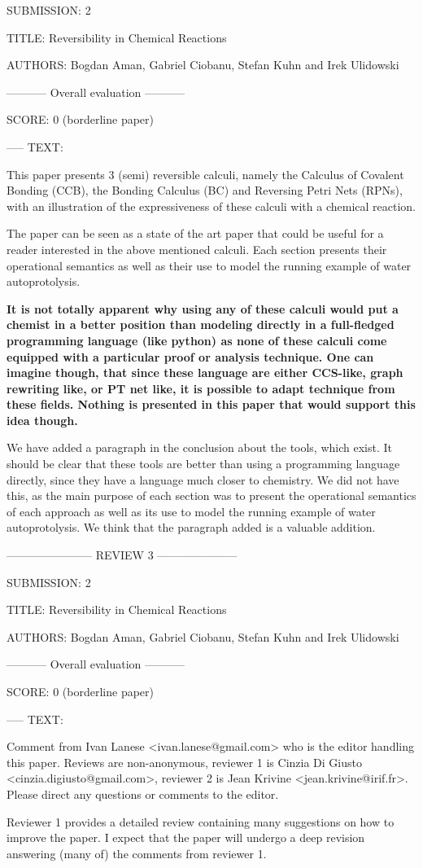 \documentclass{article}
\begin{document}
SUBMISSION: 2

TITLE: Reversibility in Chemical Reactions

AUTHORS: Bogdan Aman, Gabriel Ciobanu, Stefan Kuhn and Irek Ulidowski

----------- Overall evaluation -----------

SCORE: 0 (borderline paper)

----- TEXT:

This paper presents 3 (semi) reversible calculi, namely the Calculus of Covalent Bonding (CCB), the Bonding Calculus (BC) and Reversing Petri Nets (RPNs), with an illustration of the expressiveness of these calculi with a chemical reaction.

The paper can be seen as a state of the art paper that could be useful for a reader interested in the above mentioned calculi. Each section presents their operational semantics as well as their use to model the running example of water autoprotolysis.

\textbf{It is not totally apparent why using any of these calculi would put a chemist in a better position than modeling directly in a full-fledged programming language (like python) as none of these calculi come equipped with a particular proof or analysis technique.  One can imagine though, that since these language are either CCS-like, graph rewriting like, or PT net like, it is possible to adapt technique from these fields. Nothing is presented in this paper that would support this idea though.}

We have added a paragraph in the conclusion about the tools, which exist. It should be clear that these tools are better than using a programming language directly, since they have a language much closer to chemistry. We did not have this, as the main purpose of each section was to present the operational semantics of each approach as well as its use to model the running example of water autoprotolysis. We think that the paragraph added is a valuable addition. 

----------------------- REVIEW 3 ---------------------

SUBMISSION: 2

TITLE: Reversibility in Chemical Reactions

AUTHORS: Bogdan Aman, Gabriel Ciobanu, Stefan Kuhn and Irek Ulidowski

----------- Overall evaluation -----------

SCORE: 0 (borderline paper)

----- TEXT:

Comment from Ivan Lanese <ivan.lanese@gmail.com> who is the editor handling this paper. Reviews are non-anonymous, reviewer 1 is Cinzia Di Giusto <cinzia.digiusto@gmail.com>, reviewer 2 is Jean Krivine <jean.krivine@irif.fr>. Please direct any questions or comments to the editor.

Reviewer 1 provides a detailed review containing many suggestions on how to improve the paper. I expect that the paper will undergo a deep revision answering (many of) the comments from reviewer 1.
\end{document}
